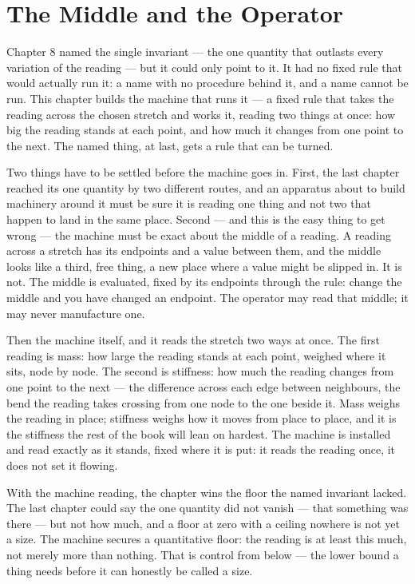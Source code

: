 \chapter{The Middle and the Operator}

Chapter 8 named the single invariant --- the one quantity that outlasts every variation of the reading --- but it could only point to it. It had no fixed rule that would actually run it: a name with no procedure behind it, and a name cannot be run. This chapter builds the machine that runs it --- a fixed rule that takes the reading across the chosen stretch and works it, reading two things at once: how big the reading stands at each point, and how much it changes from one point to the next. The named thing, at last, gets a rule that can be turned.

Two things have to be settled before the machine goes in. First, the last chapter reached its one quantity by two different routes, and an apparatus about to build machinery around it must be sure it is reading one thing and not two that happen to land in the same place. Second --- and this is the easy thing to get wrong --- the machine must be exact about the middle of a reading. A reading across a stretch has its endpoints and a value between them, and the middle looks like a third, free thing, a new place where a value might be slipped in. It is not. The middle is evaluated, fixed by its endpoints through the rule: change the middle and you have changed an endpoint. The operator may read that middle; it may never manufacture one.

Then the machine itself, and it reads the stretch two ways at once. The first reading is mass: how large the reading stands at each point, weighed where it sits, node by node. The second is stiffness: how much the reading changes from one point to the next --- the difference across each edge between neighbours, the bend the reading takes crossing from one node to the one beside it. Mass weighs the reading in place; stiffness weighs how it moves from place to place, and it is the stiffness the rest of the book will lean on hardest. The machine is installed and read exactly as it stands, fixed where it is put: it reads the reading once, it does not set it flowing.

With the machine reading, the chapter wins the floor the named invariant lacked. The last chapter could say the one quantity did not vanish --- that something was there --- but not how much, and a floor at zero with a ceiling nowhere is not yet a size. The machine secures a quantitative floor: the reading is at least this much, not merely more than nothing. That is control from below --- the lower bound a thing needs before it can honestly be called a size.

